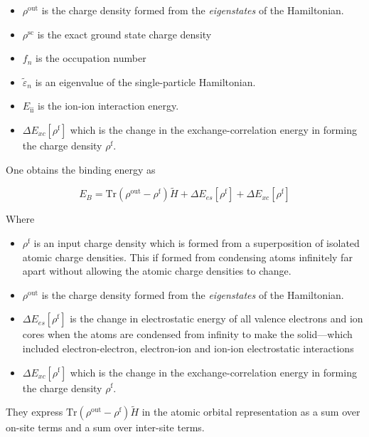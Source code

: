 \documentclass[11pt]{article}
\begin{document}
\begin{enumerate}
\begin{enumerate}
\begin{enumerate}
\begin{itemize}
\item \(\rho^{\text{out}}\) is the charge
density formed from the \emph{eigenstates} of the Hamiltonian.

\item \(\rho^{\text{sc}}\) is the exact ground state charge density

\item \(f_{n}\) is the occupation number

\item \(\tilde{\varepsilon}_{n}\) is an eigenvalue of the single-particle
Hamiltonian.

\item \(E_{\text{ii}}\) is the ion-ion interaction energy.

\item \(\Delta E_{xc}[\rho^{\text{f}}]\)  which is the change in the exchange-correlation energy in forming the charge
density \(\rho^{\text{f}}\).
\end{itemize}

One obtains the binding energy as 
\begin{LaTeX}
\[
E_{B} = \text{Tr}( \rho^{\text{out}} - \rho^{\text{f}} )\widetilde{H} + \Delta E_{es}[\rho^{\text{f}}] + \Delta E_{xc}[\rho^{\text{f}}]
\]
\end{LaTeX}

Where 
\begin{itemize}
\item \(\rho^{\text{f}}\) is an input charge density which is formed
from a superposition of isolated atomic charge densities. This if formed
from condensing atoms infinitely far apart without allowing the atomic
charge densities to change.

\item \(\rho^{\text{out}}\) is the charge
density formed from the \emph{eigenstates} of the Hamiltonian.

\item \(\Delta E_{es}[\rho^{\text{f}}]\) is the change in electrostatic energy
of all valence electrons and ion cores when the atoms are condensed from
infinity to make the solid---which included electron-electron, electron-ion
and ion-ion electrostatic interactions

\item \(\Delta E_{xc}[\rho^{\text{f}}]\)  which is the change in the exchange-correlation energy in forming the charge
density \(\rho^{\text{f}}\).
\end{itemize}

They express \(\text{Tr}(\rho^{\text{out}} - \rho^{\text{f}})\widetilde{H}\) in the atomic
orbital representation as a sum over on-site terms and a sum over inter-site
terms. 





\end{enumerate}
\end{enumerate}
\end{enumerate}
\end{document}

